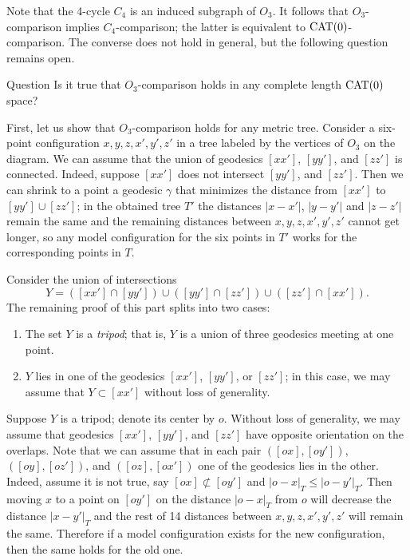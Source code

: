 \documentclass{article}
\begin{document}
Note that the 4-cycle $C_4$ is an induced subgraph of $O_3$.
It follows that $O_3$-comparison implies $C_4$-comparison;
the latter is equivalent to $\mathrm{CAT}(0)$-comparison.
The converse does not hold in general, but the following question remains open.

\begin{thm}{Question}
Is it true that $O_3$-comparison holds in any complete length $\mathrm{CAT}(0)$ space?
\end{thm}

First, let us show that $O_3$-comparison holds for any metric tree.
Consider a six-point configuration $x,y,z,x',y',z'$ in a tree labeled by the vertices of $O_3$ on the diagram.
We can assume that the union of geodesics $[xx']$, $[yy']$, and $[zz']$ is connected.
Indeed, suppose $[xx']$ does not intersect $[yy']$, and $[zz']$.
Then we can shrink to a point a geodesic $\gamma$ that minimizes the distance from $[xx']$ to $[yy']\cup[zz']$;
in the obtained tree $T'$ the distances $|x-x'|$, $|y-y'|$ and $|z-z'|$ remain the same and the remaining distances between $x,y,z,x',y',z'$ cannot get longer, so any model configuration for the six points in $T'$ works for the corresponding points in $T$.

Consider the union of intersections 
\[Y=([xx']\cap [yy'])\cup([yy']\cap [zz'])\cup([zz']\cap [xx']).\]
The remaining proof of this part splits into two cases:
\begin{enumerate}
\item The set $Y$ is a \emph{tripod}; that is, $Y$ is a union of three geodesics meeting at one point. 
\item $Y$ lies in one of the  geodesics $[xx']$, $[yy']$, or $[zz']$; in this case, we may assume that $Y\subset [xx']$ without loss of generality.
\end{enumerate}

Suppose $Y$ is a tripod; denote its center by $o$.
Without loss of generality, we may assume that geodesics $[xx']$, $[yy']$, and $[zz']$ have opposite orientation on the overlaps.
Note that we can assume that in each pair $([ox],[oy'])$, $([oy],[oz'])$, and $([oz],[ox'])$ one of the geodesics lies in the other.
Indeed, assume it is not true, say $[ox]\not\subset[oy']$ and $|o-x|_T\le |o-y'|_T$.
Then moving $x$ to a point on $[oy']$ on the distance $|o-x|_T$ from $o$ will decrease the distance $|x-y'|_T$ and the rest of 14 distances between $x,y,z,x',y',z'$ will remain the same.
Therefore if a model configuration exists for the new configuration, then the same holds for the old one. 
\end{document}
